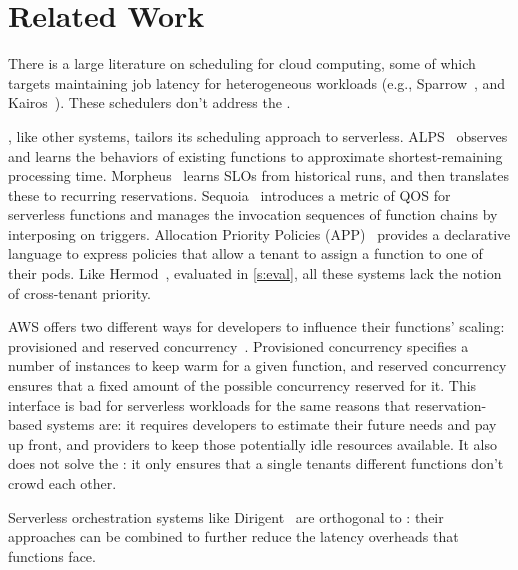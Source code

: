 \section{Related Work}


There is a large literature on scheduling for cloud computing, some of
which targets maintaining job latency for heterogeneous workloads
(e.g., Sparrow~\cite{sparrow}, and Kairos~\cite{kairos}). These
schedulers don't address the \problem.

\Sys{}, like other systems, tailors its scheduling approach to
serverless.  ALPS~\cite{alps} observes and learns the behaviors of
existing functions to approximate shortest-remaining processing time.
Morpheus~\cite{morpheus} learns SLOs from historical runs, and then
translates these to recurring reservations.  Sequoia~\cite{sequoia}
introduces a metric of QOS for serverless functions and manages the
invocation sequences of function chains by interposing on
triggers. Allocation Priority Policies (APP)~\cite{app-paper} provides
a declarative language to express policies that allow a tenant to
assign a function to one of their pods.  Like Hermod~\cite{hermod},
evaluated in \autoref{s:eval}, all these systems lack the notion of
cross-tenant priority.


AWS offers two different ways for developers to influence their functions'
scaling: provisioned and reserved concurrency~\cite{aws-scaling}. Provisioned
concurrency specifies a number of instances to keep warm for a given function,
and reserved concurrency ensures that a fixed amount of the possible concurrency
reserved for it. This interface is bad for serverless workloads for the same
reasons that reservation-based systems are: it requires developers to estimate
their future needs and pay up front, and providers to keep those potentially
idle resources available. It also does not solve the \problem{}: it only ensures
that a single tenants different functions don't crowd each other.

Serverless orchestration systems like Dirigent~\cite{dirigent} are orthogonal to
\sys{}: their approaches can be combined to further reduce the latency overheads
that functions face.


